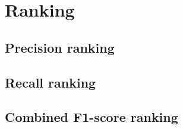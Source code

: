 \section{Ranking}
\subsection{Precision ranking}

\subsection{Recall ranking}

\subsection{Combined F1-score ranking}